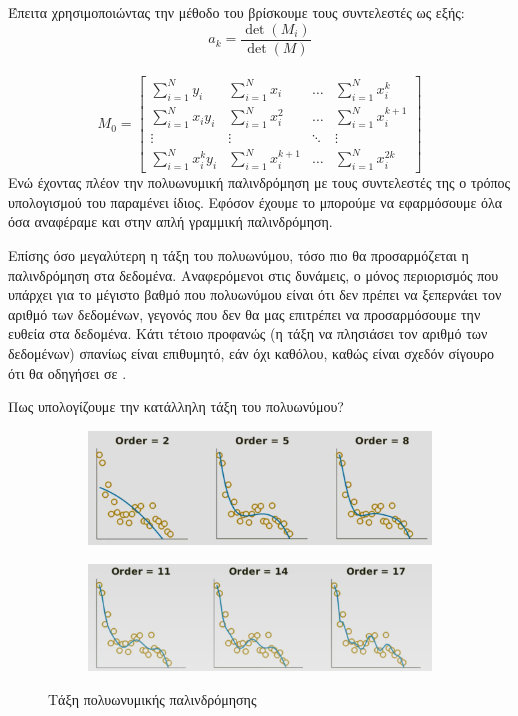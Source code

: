 Έπειτα χρησιμοποιώντας την μέθοδο του  βρίσκουμε τους συντελεστές ως εξής:
$$a_k=\frac{\det (M_i)}{\det (M)}$$
\\
$$
M_0=
\begin{bmatrix}
    \sum\limits_{i=1}^Ny_i          & \sum\limits_{i=1}^Nx_i        & \dots     & \sum\limits_{i=1}^Nx_i^k \\
    \sum\limits_{i=1}^Nx_iy_i          & \sum\limits_{i=1}^Nx_i^2      & \dots     & \sum\limits_{i=1}^Nx_i^{k+1} \\
    \vdots                          & \vdots                        & \ddots    & \vdots \\
    \sum\limits_{i=1}^Nx_i^ky_i        & \sum\limits_{i=1}^Nx_i^{k+1}  & \dots     & \sum\limits_{i=1}^Nx_i^{2k}
\end{bmatrix}
$$
Ενώ έχοντας πλέον την πολυωνυμική παλινδρόμηση με τους συντελεστές της ο τρόπος
υπολογισμού του  παραμένει ίδιος. Εφόσον έχουμε το  μπορούμε να εφαρμόσουμε
όλα όσα αναφέραμε και στην απλή γραμμική παλινδρόμηση.

Επίσης όσο μεγαλύτερη η τάξη του πολυωνύμου, τόσο πιο  θα προσαρμόζεται η
παλινδρόμηση στα δεδομένα. Αναφερόμενοι στις δυνάμεις, ο μόνος περιορισμός που
υπάρχει για το μέγιστο βαθμό που πολυωνύμου είναι ότι δεν πρέπει να ξεπερνάει τον αριθμό
των δεδομένων, γεγονός που δεν θα μας επιτρέπει να προσαρμόσουμε την ευθεία στα
δεδομένα. Κάτι τέτοιο προφανώς (η τάξη να πλησιάσει τον αριθμό των δεδομένων) σπανίως
είναι επιθυμητό, εάν όχι καθόλου, καθώς είναι σχεδόν σίγουρο ότι θα οδηγήσει σε .

Πως υπολογίζουμε την κατάλληλη τάξη του πολυωνύμου?


\begin{figure}[H]
    \centering
\begin{subfigure}{1\textwidth}
    \centering
    \includegraphics[width=1\textwidth]{images/Polynomial order 2_1.png}
\end{subfigure}
\begin{subfigure}{1\textwidth}
    \centering
    \includegraphics[width=1\textwidth]{images/Polynomial order 2_2.png}
\end{subfigure}
\caption{Τάξη πολυωνυμικής παλινδρόμησης}
\end{figure}

